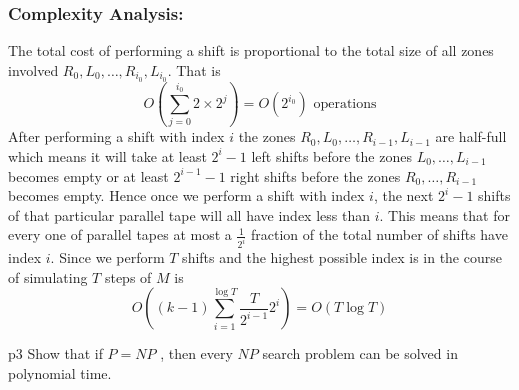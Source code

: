 \documentclass[a4paper, 11pt]{article}
\begin{document}
{		\subsubsection*{Complexity Analysis:} \parinf
		The total cost of performing a shift is proportional to the total size of all zones involved $R_0,L_0,\dots,R_{i_0},L_{i_0}$. That is $$O\left(\sum_{j=0}^{i_0}2\times 2^j  \right)=O\left(2^{i_0}\right)\text{ operations}$$After performing a shift with index $i$ the zones $R_0,L_0,\dots, R_{i-1},L_{i-1}$ are half-full which means it will take at least $2^i-1$ left shifts before the zones $L_0,\dots,L_{i-1}$ becomes empty or at least $2^{i-1}-1$ right shifts before the zones $R_0,\dots,R_{i-1}$ becomes empty. Hence once we perform a shift with index $i$, the next $2^i-1$ shifts of that particular parallel tape will all have index less than $i$. This means that for every one of parallel tapes at most a $\frac{1}{2^i}$ fraction of the total number of shifts have index $i$. Since we perform $T$ shifts and the highest possible index is in the course of simulating $T$ steps of $M$ is $$O\left( (k-1)\sum_{i=1}^{\log T} \frac{T}{2^{i-1}}2^i \right)=O(T\log T)$$
	}
	\pagebreak
	
	
	\begin{problem}{%
		}{p3%
		}
		Show that if $P = N P$ , then every $N P$ search problem can be solved in
		polynomial time.
				
	\end{problem}
	
\end{document}
